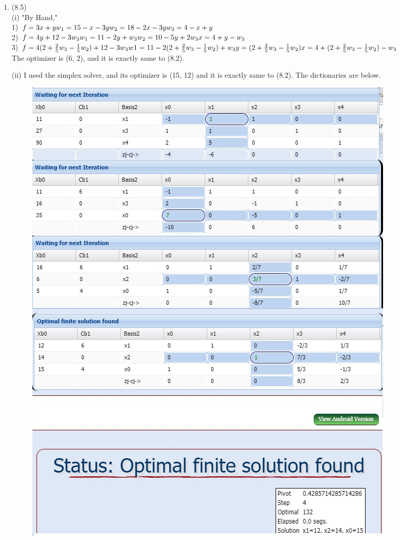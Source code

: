 \documentclass[letterpaper,12pt]{article}
\theoremstyle{definition}
\begin{document}
\begin{enumerate}
	\item (8.5) \\
(i) "By Hand," \\
1) $f = 3x +y \\
w_1 = 15-x-3y\\
w_2 = 18 - 2x - 3y \\
w_3 = 4 - x + y\\$
\\
2) $f = 4y + 12 - 3w_3\\
w_1 = 11 - 2y + w_3\\
w_2 = 10 -5y +2w_3\\
x = 4 + y - w_3\\$
\\
3) $f = 4(2+\frac{2}{5}w_3-\frac{1}{5}w_2) + 12 -3w_3\\
w1 = 11 - 2(2+\frac{2}{5}w_3-\frac{1}{5}w_2) + w_3\\
y = (2+\frac{2}{5}w_3-\frac{1}{5}w_2)\\
x = 4 + (2+\frac{2}{5}w_3-\frac{1}{5}w_2) - w_3\\$
\\
The optimizer is (6, 2), and it is exactly same to (8.2).

(ii) I used the simplex solver, and its optimizer is (15, 12) and it is exactly same to (8.2). The dictionaries are below.
\begin{figure}[htbp]
\begin{center}
    \includegraphics[scale=0.46]{8p5b}
    \caption{} \label{fig:label}
\end{center}
\end{figure}


\end{enumerate}
\end{document}

